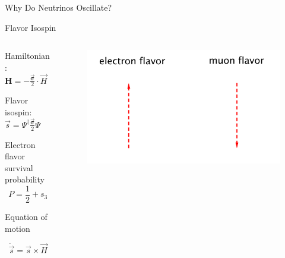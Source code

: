 \documentclass[9pt]{beamer}
\begin{document}
\begin{darkframes}
\begin{frame}[fragile]{Why Do Neutrinos Oscillate?}
\begin{tcolorbox}
\end{tcolorbox}






\end{frame}



\begin{frame}{Flavor Isospin}








\begin{columns}[T]
\begin{column}{0.5\textwidth}


Hamiltonian: $\mathbf H = - \frac{\vec{\boldsymbol{\sigma}} }{2}\cdot \vec H$


Flavor isospin: $\vec s = \Psi^{\dagger} \frac{\vec{\boldsymbol{\sigma}} }{2} \Psi $

\small
Electron flavor survival probability
\vspace*{0pt}
\begin{equation*}
P = \frac{1}{2} + s_3
\end{equation*}


Equation of motion

\begin{equation*}
\dot{\vec s} = \vec s \times \vec H
\end{equation*}




\end{column}%
\begin{column}{0.5\textwidth}

\begin{tcolorbox}
\begin{figure}
    \centering
    \includegraphics[width=\textwidth]{assets/flavor-isospin-illus}
\end{figure}
\end{tcolorbox}


\end{column}
\end{columns}
\end{frame}
\end{darkframes}
\end{document}
